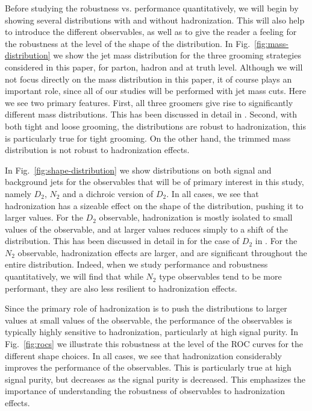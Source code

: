 \documentclass[11pt,letterpaper]{article}
\DeclareRobustCommand{\Fig}[1]{Fig.~\ref{#1}}
\begin{document}
Before studying the robustness vs. performance quantitatively, we will begin by showing several distributions with and without hadronization. This will also help to introduce the different observables, as well as to give the reader a feeling for the robustness at the level of the shape of the distribution. In \Fig{fig:mass-distribution} we show the jet mass distribution for the three grooming strategies considered in this paper, for parton, hadron and at truth level. Although we will not focus directly on the mass distribution in this paper, it of course plays an important role, since all of our studies will be performed with jet mass cuts. Here we see two primary features. First, all three groomers give rise to significantly different mass distributions. This has been discussed in detail in \cite{Dasgupta:2013ihk,Larkoski:2014wba}. Second, with both tight and loose grooming, the distributions are robust to hadronization, this is particularly true for tight grooming. On the other hand, the trimmed mass distribution is not robust to hadronization effects. 

In \Fig{fig:shape-distribution} we show distributions on both signal and background jets for the observables that will be of primary interest in this study, namely $D_2$, $N_2$ and a dichroic version of $D_2$.   In all cases, we see that hadronization has a sizeable effect on the shape of the distribution, pushing it to larger values. For the $D_2$ observable, hadronization is mostly isolated to small values of the observable, and at larger values reduces simply to a shift of the distribution. This has been discussed in detail in for the case of $D_2$ in \cite{Larkoski:2015kga,Larkoski:2017cqq,Larkoski:2017iuy}. For the $N_2$ observable, hadronization effects are larger, and are significant throughout the entire distribution. Indeed, when we study performance and robustness quantitatively, we will find that while $N_2$ type observables tend to be more performant, they are also less resilient to hadronization effects. 

Since the primary role of hadronization is to push the distributions to larger values at small values of the observable, the performance of the observables is typically highly sensitive to hadronization, particularly at high signal purity. In \Fig{fig:rocs} we illustrate this robustness at the level of the ROC curves for the different shape choices. In all cases, we see that hadronization considerably improves the performance of the observables. This is particularly true at high signal purity, but decreases as the signal purity is decreased. This emphasizes the importance of understanding the robustness of observables to hadronization effects.
\end{document}
